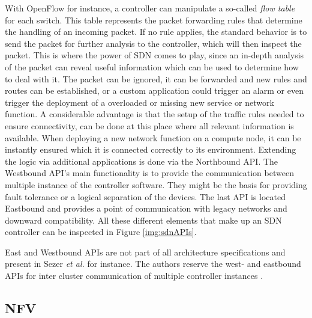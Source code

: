 With OpenFlow for instance, a controller can manipulate a so-called \textit{flow table} for each switch. This table represents the packet forwarding rules that determine the handling of an incoming packet. If no rule applies, the standard behavior is to send the packet for further analysis to the controller, which will then inspect the packet. This is where the power of SDN comes to play, since an in-depth analysis of the packet can reveal useful information which can be used to determine how to deal with it. The packet can be ignored, it can be forwarded and new rules and routes can be established, or a custom application could trigger an alarm or even trigger the deployment of a overloaded or missing new service or network function. A considerable advantage is that the setup of the traffic rules needed to ensure connectivity, can be done at this place where all relevant information is available. When deploying a new network function on a compute node, it can be instantly ensured which it is connected correctly to its environment. Extending the logic via additional applications is done via the Northbound API. The Westbound API's main functionality is to provide the communication between multiple instance of the controller software. They might be the basis for providing fault tolerance or a logical separation of the devices. The last API is located Eastbound and provides a point of communication with legacy networks and downward compatibility. All these different elements that make up an SDN controller can be inspected in Figure \ref{img:sdnAPIs}.

East and Westbound APIs are not part of all architecture specifications and present in Sezer \textit{et al.} \cite{sezer2013we} for instance. The authors reserve the west- and eastbound APIs for inter cluster communication of multiple controller instances \cite{nunes2014survey} \cite{jarschel2014interfaces} \cite{sezer2013we} \cite{hu2014survey} \cite{shin2012software} \cite{jammal2014software}.

\subsection{NFV}

